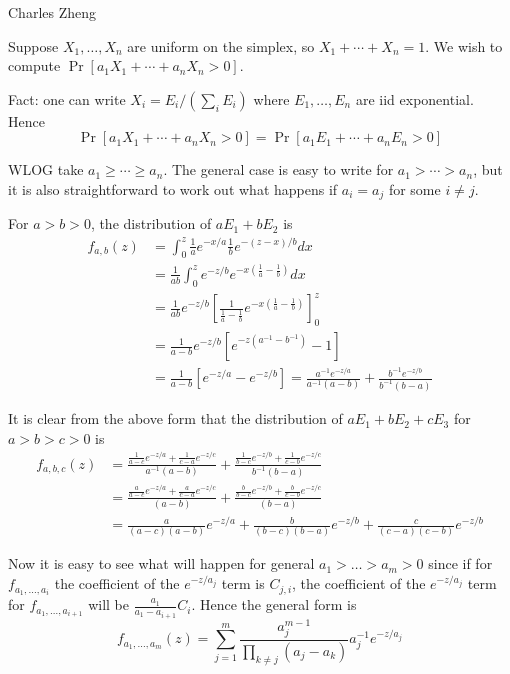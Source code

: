 \documentclass[11pt]{letter}
\begin{document}
\newcommand{\tr}{\text{tr}}
\newcommand{\E}{\textbf{E}}
\newcommand{\diag}{\text{diag}}
\newcommand{\argmax}{\text{argmax}}
\newcommand{\Cov}{\text{Cov}}

Charles Zheng

Suppose $X_1,\hdots,X_n$ are uniform on the simplex, so
$X_1+\cdots+X_n=1$.
We wish to compute $\Pr[a_1 X_1 + \cdots + a_n X_n  > 0]$.

Fact: one can write $X_i = E_i/(\sum_i E_i)$  where $E_1,\hdots,E_n$
are iid exponential.
Hence
\[
\Pr[a_1 X_1 + \cdots + a_n X_n  > 0] = \Pr[a_1 E_1 + \cdots + a_n E_n
> 0]
\]

WLOG take $a_1 \geq \cdots \geq a_n$.
The general case is easy to write for $a_1 > \cdots > a_n$,
but it is also straightforward to work out what happens if $a_i = a_j$
for some $i \neq j$.

For $a > b > 0$, the distribution of $aE_1 + bE_2$ is
\begin{align*}
f_{a,b}(z) &= \int_0^z \frac{1}{a}e^{-x/a} \frac{1}{b} e^{-(z-x)/b} dx
\\&= \frac{1}{ab} \int_0^z e^{-z/b}e^{-x(\frac{1}{a}-\frac{1}{b})} dx
\\&= \frac{1}{ab}e^{-z/b} \left[\frac{1}{\frac{1}{a} - \frac{1}{b}} 
e^{-x(\frac{1}{a}-\frac{1}{b})} \right]_0^z
\\&= \frac{1}{a-b} e^{-z/b} [e^{-z(a^{-1}-b^{-1})}-1]
\\&= \frac{1}{a-b} [e^{-z/a} - e^{-z/b}] = \frac{a^{-1}e^{-z/a}}{a^{-1}(a-b)} + \frac{b^{-1}e^{-z/b}}{b^{-1}(b-a)}
\end{align*}

It is clear from the above form that the distribution of $aE_1 +
bE_2 + cE_3$ for $a > b > c > 0$ is
\begin{align*}
f_{a,b,c}(z) &=
\frac{\frac{1}{a-c}e^{-z/a}+\frac{1}{c-a}e^{-z/c}}{a^{-1}(a-b)}
+ \frac{\frac{1}{b-c}e^{-z/b} + \frac{1}{c-b}e^{-z/c}}{b^{-1}(b-a)}
\\&=\frac{\frac{a}{a-c}e^{-z/a}+\frac{a}{c-a}e^{-z/c}}{(a-b)}
+ \frac{\frac{b}{b-c}e^{-z/b} + \frac{b}{c-b}e^{-z/c}}{(b-a)}
\\&= \frac{a}{(a-c)(a-b)} e^{-z/a} + \frac{b}{(b-c)(b-a)} e^{-z/b} +
\frac{c}{(c-a)(c-b)} e^{-z/b}
\end{align*}

Now it is easy to see what will happen for general $a_1 > \hdots > a_m
> 0$ since if for $f_{a_1,\hdots,a_i}$ the coefficient of the
$e^{-z/a_j}$ term is $C_{j,i}$,
the coefficient of the $e^{-z/a_j}$ term for $f_{a_1,\hdots,a_{i+1}}$
will be $\frac{a_1}{a_1-a_{i+1}}C_i$.
Hence the general form is
\[
f_{a_1,\hdots,a_m}(z) = \sum_{j=1}^m \frac{a_j^{m-1}}{\prod_{k \neq
    j}(a_j-a_k)} a_j^{-1} e^{-z/a_j}
\]
\end{document}
